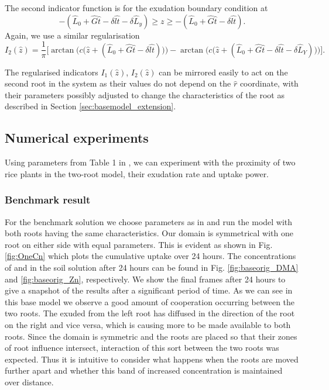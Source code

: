 \documentclass[11pt]{article}
\numberwithin{equation}{section}
\begin{document}
The second indicator function is for the exudation boundary condition at 
\[
    -(\hat L_0 + \hat G \hat t - \delta \widehat{lt} - \delta \hat L_y) \geq z \geq -(\hat L_0 + \hat G \hat t - \delta \widehat{lt}).
\]
Again, we use a similar regularisation
\begin{equation}
    I_2 (\hat z) = \frac{1}{\pi} \bigg[ \arctan\Big(c \big(\hat z + (\hat L_0 + \hat G\hat t -\delta \widehat{lt}) \big) \Big) - \arctan\big(c \big( \hat z+(\hat L_0 + \hat G \hat t - \delta \widehat{lt} - \delta \hat L_Y ) \big) \Big) \bigg].
\end{equation}

The regularised indicators $I_1(\hat z)$, $I_2(\hat z)$ can be mirrored easily to act on the second root in the system as their values do not depend on the $\hat r$ coordinate, with their parameters possibly adjusted to change the characteristics of the root as described in Section \ref{sec:basemodel_extension}.

\subsection{Numerical experiments}
\label{sec:basemodel_exper}
Using parameters from Table 1 in \cite{Ptashnyk-2011}, we can experiment with the proximity of two rice plants in the two-root model, their exudation rate and uptake power.

\subsubsection{Benchmark result}

For the benchmark solution we choose parameters as in \cite{Ptashnyk-2011} and run the model with both roots having the same characteristics. Our domain is symmetrical with one root on either side with equal parameters. This is evident as shown in Fig. \ref{fig:OneCn} which plots the cumulative  uptake over 24 hours. The concentrations of  and  in the soil solution after 24 hours can be found in Fig. \ref{fig:baseorig_DMA} and \ref{fig:baseorig_Zn}, respectively. We show the final frames after 24 hours to give a snapshot of the results after a significant period of time. As we can see in this base model we observe a good amount of cooperation occurring between the two roots. The  exuded from the left root has diffused in the direction of the root on the right and vice versa, which is causing more  to be made available to both roots. Since the domain is symmetric and the roots are placed so that their zones of root influence intersect, interaction of this sort between the two roots was expected. Thus it is intuitive to consider what happens when the roots are moved further apart and whether this band of increased  concentration is maintained over distance.  
\end{document}
